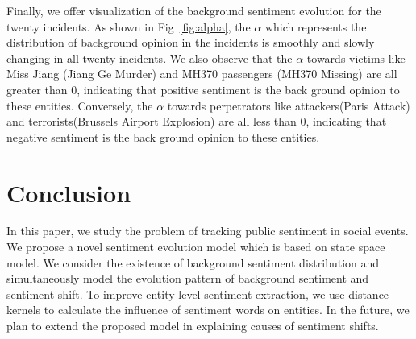 \documentclass[runningheads]{llncs}
\begin{document}
Finally, we offer visualization of the background sentiment evolution for the twenty incidents. 
As shown in Fig~\ref{fig:alpha}, the $\alpha$ which represents the distribution of background opinion in the incidents is smoothly and slowly changing in all twenty incidents. We also observe that the $\alpha$ towards victims like Miss Jiang (Jiang Ge Murder) and MH370 passengers (MH370 Missing) are all greater than 0, indicating that positive sentiment is the back ground opinion to these entities. Conversely, the $\alpha$ towards perpetrators like attackers(Paris Attack) and terrorists(Brussels Airport Explosion) are all less than 0, indicating that negative sentiment is the back ground opinion to these entities. 


\section{Conclusion}\label{sec:conclusion}
In this paper, we study the problem of tracking public sentiment in social events. We propose a novel sentiment evolution model which is based on state space model. We consider the existence of background sentiment distribution and simultaneously model the evolution pattern of background sentiment and sentiment shift. To improve entity-level sentiment extraction, we use distance kernels to calculate the influence of sentiment words on entities. In the future, we plan to extend the proposed model in explaining causes of sentiment shifts.
\end{document}
